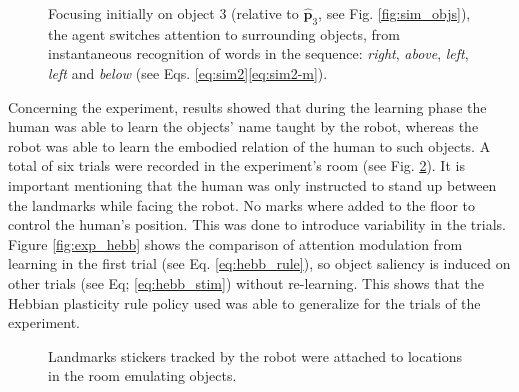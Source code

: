 \documentclass[letterpaper, 10 pt, conference]{ieeeconf}  %
\begin{document}
\begin{figure}[h!]
\begin{center}
	\end{center}
	\caption{Focusing initially on object 3 (relative to $\mathbf{\hat{p}}_3$, see Fig. \ref{fig:sim_objs}), the agent switches attention to surrounding objects, from instantaneous recognition of words in the sequence: \textit{right}, \textit{above}, \textit{left}, \textit{left} and \textit{below} (see Eqs. \eqref{eq:sim2}\eqref{eq:sim2-m}).}
	\label{fig:sim2-around}
\end{figure}

Concerning the experiment, results showed that during the learning phase the human was able to learn the objects' name taught by the robot, whereas the robot was able to learn the embodied relation of the human to such objects. A total of six trials were recorded in the experiment's room (see Fig. \ref{fig:exp_scene}). It is important mentioning that the human was only instructed to stand up between the landmarks while facing the robot. No marks where added to the floor to control the human's position. This was done to introduce variability in the trials. Figure \ref{fig:exp_hebb} shows  the comparison of attention modulation from learning in the first trial (see Eq. \eqref{eq:hebb_rule}), so object saliency is induced on other trials (see Eq; \eqref{eq:hebb_stim}) without re-learning. This shows that the Hebbian plasticity rule policy used was able to generalize for the trials of the experiment.

\begin{figure}[h!]
	\begin{center}
		
	\end{center}
	\caption{Landmarks stickers tracked by the robot were attached to locations in the room emulating objects.}
	\label{fig:exp_scene}
\end{figure}
\end{document}
